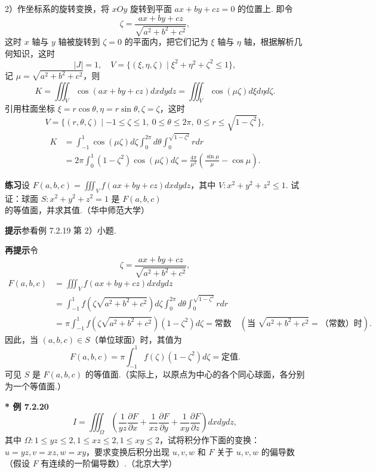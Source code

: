 \documentclass[UTF8,12pt,a4paper,fontset=fandol]{ctexart}
\begin{document}
2）作坐标系的旋转变换，将 $xOy$ 旋转到平面 $ax+by+cz=0$ 的位置上. 即令
\[
\zeta=\frac{ax+by+cz}{\sqrt{a^2+b^2+c^2}},
\]
这时 $x$ 轴与 $y$ 轴被旋转到 $\zeta=0$ 的平面内，把它们记为 $\xi$ 轴与 $\eta$ 轴，根据解析几何知识，这时
\[
|J|=1,\quad V=\{(\xi,\eta,\zeta)\mid \xi^2+\eta^2+\zeta^2\le1\},
\]
记 $\mu=\sqrt{a^2+b^2+c^2}$，则
\[
K=\iiint_V\cos(ax+by+cz)dxdydz
=\iiint_V\cos(\mu\zeta)d\xi d\eta d\zeta.
\]
引用柱面坐标 $\xi=r\cos\theta,\eta=r\sin\theta,\zeta=\zeta$，这时
\[
V=\{(r,\theta,\zeta)\mid -1\le\zeta\le1,\ 0\le\theta\le2\pi,\ 0\le r\le\sqrt{1-\zeta^2}\},
\]
\[
\begin{aligned}
K&=\int_{-1}^1\cos(\mu\zeta)d\zeta
\int_0^{2\pi}d\theta\int_0^{\sqrt{1-\zeta^2}}rdr\\
&=2\pi\int_0^1(1-\zeta^2)\cos(\mu\zeta)d\zeta
=\frac{4\pi}{\mu^2}\left(\frac{\sin\mu}{\mu}-\cos\mu\right).
\end{aligned}
\]

\noindent\textbf{练习}\quad 设 $F(a,b,c)=\iiint_V f(ax+by+cz)dxdydz$，其中 $V:x^2+y^2+z^2\le1$. 试证：球面 $S:x^2+y^2+z^2=1$ 是 $F(a,b,c)$ 的等值面，并求其值.（华中师范大学）

\noindent\textbf{提示}\quad 参看例 7.2.19 第 2）小题.

\noindent\textbf{再提示}\quad 令
\[
\zeta=\frac{ax+by+cz}{\sqrt{a^2+b^2+c^2}},
\]
\[
\begin{aligned}
F(a,b,c)&=\iiint_V f(ax+by+cz)dxdydz\\
&=\int_{-1}^1f\left(\zeta\sqrt{a^2+b^2+c^2}\right)d\zeta
\int_0^{2\pi}d\theta\int_0^{\sqrt{1-\zeta^2}}rdr\\
&=\pi\int_{-1}^1f\left(\zeta\sqrt{a^2+b^2+c^2}\right)(1-\zeta^2)d\zeta
=\text{常数}\quad\left(\text{当 }\sqrt{a^2+b^2+c^2}=\text{（常数）时}\right).
\end{aligned}
\]
因此，当 $(a,b,c)\in S$（单位球面）时，其值为
\[
F(a,b,c)=\pi\int_{-1}^1f(\zeta)(1-\zeta^2)d\zeta=\text{定值}.
\]
可见 $S$ 是 $F(a,b,c)$ 的等值面.（实际上，以原点为中心的各个同心球面，各分别为一个等值面.）

\noindent\textbf{* 例 7.2.20}\quad
\[
I=\iiint_\Omega\left(\frac1{yz}\frac{\partial F}{\partial x}
+\frac1{xz}\frac{\partial F}{\partial y}
+\frac1{xy}\frac{\partial F}{\partial z}\right)dxdydz,
\]
其中 $\Omega:1\le yz\le2,1\le xz\le2,1\le xy\le2$，试将积分作下面的变换：$u=yz,v=xz,w=xy$，要求变换后积分出现 $u,v,w$ 和 $F$ 关于 $u,v,w$ 的偏导数（假设 $F$ 有连续的一阶偏导数）.（北京大学）
\end{document}
